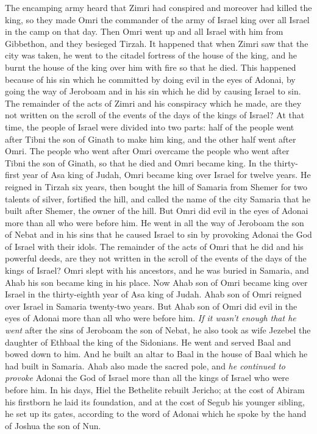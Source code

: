 \begin{biblechapter}
\verse The encamping army heard that Zimri had conspired and moreover had killed the king, so they made Omri the commander of the army of Israel king over all Israel in the camp on that day.
\verse Then Omri went up and all Israel with him from Gibbethon, and they besieged Tirzah.
\verse It happened that when Zimri saw that the city was taken, he went to the citadel fortress of the house of the king, and he burnt the house of the king over him with fire so that he died.
\verse This happened because of his sin which he committed by doing evil in the eyes of Adonai, by going the way of Jeroboam and in his sin which he did by causing Israel to sin.
\verse The remainder of the acts of Zimri and his conspiracy which he made, are they not written on the scroll of the events of the days of the kings of Israel?
 At that time, the people of Israel were divided into two parts: half of the people went after Tibni the son of Ginath to make him king, and the other half went after Omri.
\verse The people who went after Omri overcame the people who went after Tibni the son of Ginath, so that he died and Omri became king.
\verse In the thirty-first year of Asa king of Judah, Omri became king over Israel for twelve years. He reigned in Tirzah six years,
\verse then bought the hill of Samaria from Shemer for two talents of silver, fortified the hill, and called the name of the city Samaria that he built after Shemer, the owner of the hill.
\verse But Omri did evil in the eyes of Adonai more than all who were before him.
\verse He went in all the way of Jeroboam the son of Nebat and in his sins that he caused Israel to sin by provoking Adonai the God of Israel with their idols.
\verse The remainder of the acts of Omri that he did and his powerful deeds, are they not written in the scroll of the events of the days of the kings of Israel?
\verse Omri slept with his ancestors, and he was buried in Samaria, and Ahab his son became king in his place.
 Now Ahab son of Omri became king over Israel in the thirty-eighth year of Asa king of Judah. Ahab son of Omri reigned over Israel in Samaria twenty-two years.
\verse But Ahab son of Omri did evil in the eyes of Adonai more than all who were before him.
\verse \textit{If it wasn’t enough that he went} after the sins of Jeroboam the son of Nebat, he also took as wife Jezebel the daughter of Ethbaal the king of the Sidonians. He went and served Baal and bowed down to him.
\verse And he built an altar to Baal in the house of Baal which he had built in Samaria.
\verse Ahab also made the sacred pole, and \textit{he continued to provoke} Adonai the God of Israel more than all the kings of Israel who were before him.
\verse In his days, Hiel the Bethelite rebuilt Jericho; at the cost of Abiram his firstborn he laid its foundation, and at the cost of Segub his younger sibling, he set up its gates, according to the word of Adonai which he spoke by the hand of Joshua the son of Nun.
\end{biblechapter}

